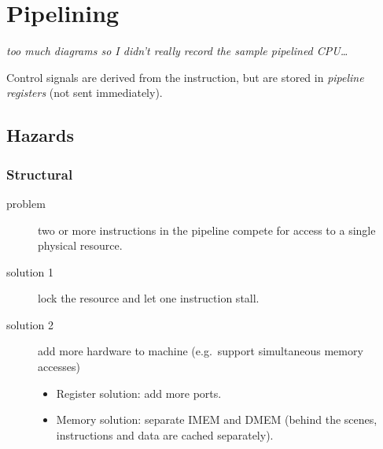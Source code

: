 \chapter{Pipelining}
\emph{too much diagrams so I didn't really record the sample pipelined CPU\ldots}

Control signals are derived from the instruction,
but are stored in \emph{pipeline registers} (not sent immediately).

\section{Hazards}
\subsection{Structural}
\begin{description}
	\item[problem] two or more instructions in the pipeline compete for access to a single physical resource.
	\item[solution 1] lock the resource and let one instruction stall.
	\item[solution 2] add more hardware to machine (e.g.~support simultaneous memory accesses)
	\begin{itemize}
		\item Register solution: add more ports.
		\item Memory solution: separate IMEM and DMEM (behind the scenes, instructions and data are cached separately).
	\end{itemize}
\end{description}

